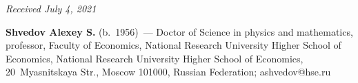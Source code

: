 \vspace*{-9pt}

\hfill{\small\textit{Received July 4, 2021}}    

\vspace*{-18pt}

\Contrl

\vspace*{-3pt}

\noindent
\textbf{Shvedov Alexey S.} (b.\ 1956)~--- Doctor of Science in physics and mathematics, 
professor, Faculty of Economics, National Research University Higher School of Economics, 
National Research University Higher School of Economics, 20~Myasnitskaya Str., Moscow 101000, Russian Federation;
\mbox{ashvedov@hse.ru}
 



\label{end\stat}

\renewcommand{\bibname}{\protect\rm Литература}    